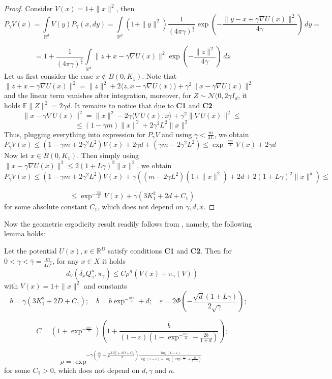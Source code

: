 \documentclass[leqno,11pt,a4paper]{article}
\begin{document}
\begin{proof} Consider $V(x) = 1 + \|x\|^2$, then
$$
P_{\gamma}V(x) = \int\limits_{\mathbb{R}^d}V(y)P_{\gamma}(x,dy) = \int\limits_{\mathbb{R}^d}(1+\|y\|^2)\frac{1}{(4\pi\gamma)^{\frac{d}{2}}}\exp{\left(-\frac{\|y-x+\gamma\nabla U(x)\|^2}{4\gamma}\right)}\,dy = 
$$

$$
=1 + \frac{1}{(4\pi\gamma)^{\frac{d}{2}}}\int\limits_{\mathbb{R}^d}\|z + x - \gamma \nabla U(x)\|^2 \exp{\left(-\frac{\|z\|^2}{4\gamma}\right)}\,dz
$$
Let us first consider the case $x \notin B(0,K_1)$. Note that $\|z+x-\gamma \nabla U(x)\|^2 = \|z\|^2 + 2 \langle z, x - \gamma \nabla U(x) \rangle + \gamma^2 \|x - \gamma \nabla U(x)\|^2$ and the linear term vanishes after integration, moreover, for $Z \sim \mathcal{N}(0,2\gamma I_d$, it holds $\mathbb{E}\|Z\|^2 = 2\gamma d$. It remains to notice that due to {\bf C1} and {\bf C2}
$$
\|x - \gamma \nabla U(x) \|^2 = \|x\|^2 - 2\gamma \langle \nabla U(x), x\rangle + \gamma^2 \|\nabla U(x)\|^2 \leq
$$
$$
 \leq (1-\gamma m)\|x\|^2 + 2\gamma^2 L^2 \|x\|^2
$$
Thus, plugging everything into expression for $P_{\gamma}V$ and using $\gamma < \frac{m}{4L}$, we obtain
$$
P_{\gamma}V(x) \leq (1-\gamma m + 2\gamma^2 L^2)V(x) + 2\gamma d + (\gamma m - 2\gamma^2 L^2) \leq \exp^{-\frac{\gamma m}{2}}V(x) + 2\gamma d
$$
Now let $x \in B(0,K_1)$. Then simply using $\|x-\gamma \nabla U(x)\|^2 \leq 2(1+L\gamma)^2\|x\|^2$, we obtain
$$
P_{\gamma}V(x) \leq (1-\gamma m + 2\gamma^2 L^2)V(x) + \gamma\left((m - 2\gamma L^2)(1+\|x\|^2) + 2d + 2(1+L\gamma)^2\|x\|^d\right) \leq 
$$

$$
\leq \exp^{-\frac{\gamma m}{2}}V(x) + \gamma(3K_1^2 + 2d + C_1)
$$
for some absolute constant $C_1$, which does not depend on $\gamma, d, x$.
\end{proof}

Now the geometric ergodicity result readily follows from \cite[Theorem~19.4.1]{douc:moulines:priouret:soulier:2018}, namely, the following lemma holds:

\begin{lemma} Let the potential $U(x), x \in \mathbb{R}^D$ satisfy conditions {\bf C1} and {\bf C2}. Then for $0 < \gamma < \overline{\gamma}=\frac{m}{4L^2}$, for any $x \in X$ it holds
$$
d_V(\delta_xQ^n_\gamma,\pi_\gamma) \leq C\rho^n\left(V(x) + \pi_\gamma(V)\right)
$$ 
with $V(x) = 1 + \|x\|^2$ and constants
$$
b = \gamma(3K_1^2 + 2D + C_1); \quad \overline{b} = b\exp^{-\frac{m\gamma}{2}} + d; \quad \varepsilon = 2\Phi\left(-\frac{\sqrt{d}(1+L\gamma)}{2\sqrt{\gamma}}\right); \quad
$$

$$
C = \left(1 + \exp^{-\frac{m\gamma}{2}}\right)\left(1+\frac{\overline{b}}{(1-\varepsilon)(1-\exp^{-\frac{m\gamma}{2}} - \frac{2b}{1+d})}\right);
$$

$$
\rho = \exp^{-\gamma\left(\frac{m}{2} - 2\frac{3K_1^2 + 2D + C_1}{d}\right)\frac{\log{(1-\varepsilon)}}{\log{(1-\varepsilon)} + \log{(\exp^{-\frac{m\gamma}{2}} + \frac{2b}{d+1})}}}
$$
for some $C_1 > 0$, which does not depend on $d, \gamma$ and $n$.
\end{lemma}
\end{document}

